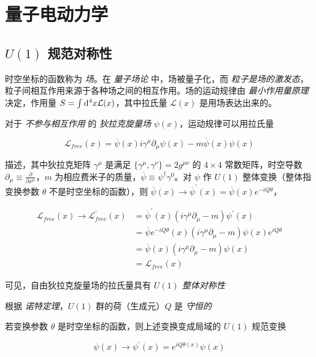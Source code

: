 \section{量子电动力学}

\subsection{\texorpdfstring{$U(1)$}{U(1)} 规范对称性}

时空坐标的函数称为 \emph{场}。在 \emph{量子场论} 中，场被量子化，而 \emph{粒子是场的激发态}，粒子间相互作用来源于各种场之间的相互作用。场的运动规律由 \emph{最小作用量原理} 决定，作用量 $S=\int \mathop{}\!\mathrm{d}^4 x \mathcal{L}(x)$，其中拉氏量 $\mathcal{L}(x)$ 是用场表达出来的。

对于 \emph{不参与相互作用} 的 \emph{狄拉克旋量场} $\psi(x)$，运动规律可以用拉氏量

\begin{equation}
    \mathcal{L}_{free}(x) = \overline{\psi}(x) i \gamma^\mu \partial_\mu \psi(x) - m \overline{\psi}(x) \psi(x)
\end{equation}

描述，其中狄拉克矩阵 $\gamma^\mu$ 是满足 $\{\gamma^\mu, \gamma^\nu\}=2 g^{\mu\nu}$ 的 $4 \times 4$ 常数矩阵，时空导数 $\partial_\mu \equiv \frac{\partial}{\partial x^\mu}$，$m$ 为相应费米子的质量，$\overline{\psi} \equiv \psi^\dagger \gamma^0$。对 $\psi$ 作 $U(1)$ 整体变换（整体指变换参数 $\theta$ 不是时空坐标的函数），则 $\overline{\psi}(x) \to \overline{\psi}^\prime (x) = \overline{\psi}(x) e^{-iQ\theta}$，

\begin{align}
    \mathcal{L}_{free} (x) \to \mathcal{L}_{free}^\prime (x) &= \overline{\psi}^\prime (x) (i \gamma^\mu \partial_\mu - m) \psi^\prime(x) \\
    &= \overline{\psi} e^{-iQ\theta} (x) (i \gamma^\mu \partial_\mu - m) \psi(x) e^{iQ\theta} \\
    &= \overline{\psi}(x) (i \gamma^\mu \partial_\mu - m) \psi(x) \\
    &= \mathcal{L}_{free} (x)
\end{align}

可见，自由狄拉克旋量场的拉氏量具有 \emph{$U(1)$ 整体对称性}

根据 \emph{诺特定理}，$U(1)$ 群的荷（生成元）$Q$ 是 \emph{守恒的}

若变换参数 $\theta$ 是时空坐标的函数，则上述变换变成局域的 $U(1)$ 规范变换

\begin{equation}
    \psi(x) \to \psi^\prime(x) = e^{iQ\theta(x)} \psi(x)
\end{equation}

